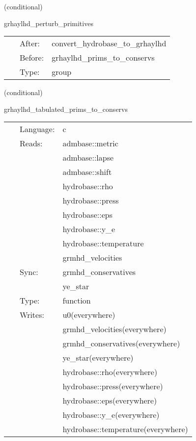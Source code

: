 \vspace{5mm}

   (conditional) 

\hspace{5mm} grhaylhd\_perturb\_primitives 

\hspace{5mm}{\it perturb initial primitive data } 


\hspace{5mm}

 \begin{tabular*}{160mm}{cll} 
~ & After:  & convert\_hydrobase\_to\_grhaylhd \\ 
~ & Before:  & grhaylhd\_prims\_to\_conservs \\ 
~ & Type:  & group \\ 
\end{tabular*} 


\vspace{5mm}

   (conditional) 

\hspace{5mm} grhaylhd\_tabulated\_prims\_to\_conservs 

\hspace{5mm}{\it tabulated version of grhaylhd\_prims\_to\_conservs } 


\hspace{5mm}

 \begin{tabular*}{160mm}{cll} 
~ & Language:  & c \\ 
~ & Reads:  & admbase::metric \\ 
~& ~ &admbase::lapse\\ 
~& ~ &admbase::shift\\ 
~& ~ &hydrobase::rho\\ 
~& ~ &hydrobase::press\\ 
~& ~ &hydrobase::eps\\ 
~& ~ &hydrobase::y\_e\\ 
~& ~ &hydrobase::temperature\\ 
~& ~ &grmhd\_velocities\\ 
~ & Sync:  & grmhd\_conservatives \\ 
~& ~ &ye\_star\\ 
~ & Type:  & function \\ 
~ & Writes:  & u0(everywhere) \\ 
~& ~ &grmhd\_velocities(everywhere)\\ 
~& ~ &grmhd\_conservatives(everywhere)\\ 
~& ~ &ye\_star(everywhere)\\ 
~& ~ &hydrobase::rho(everywhere)\\ 
~& ~ &hydrobase::press(everywhere)\\ 
~& ~ &hydrobase::eps(everywhere)\\ 
~& ~ &hydrobase::y\_e(everywhere)\\ 
~& ~ &hydrobase::temperature(everywhere)\\ 
\end{tabular*} 


